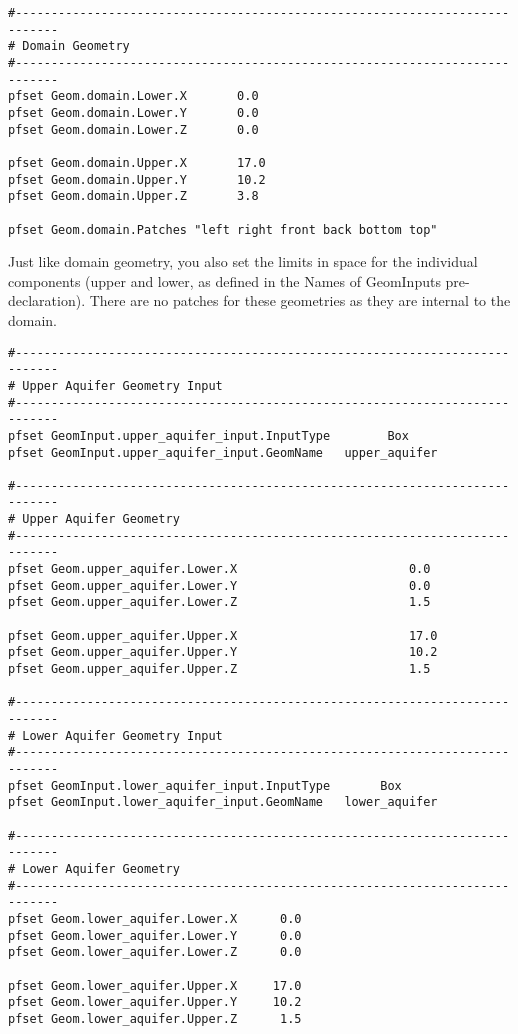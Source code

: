 \begin{verbatim}
#----------------------------------------------------------------------------
# Domain Geometry
#----------------------------------------------------------------------------
pfset Geom.domain.Lower.X       0.0 
pfset Geom.domain.Lower.Y       0.0
pfset Geom.domain.Lower.Z       0.0

pfset Geom.domain.Upper.X       17.0
pfset Geom.domain.Upper.Y       10.2
pfset Geom.domain.Upper.Z       3.8

pfset Geom.domain.Patches "left right front back bottom top"
\end{verbatim}

Just like domain geometry, you also set the limits in space for the individual components 
(upper and lower, as defined in the Names of GeomInputs pre-declaration).  There are no patches 
for these geometries as they are internal to the domain.

\begin{verbatim}
#----------------------------------------------------------------------------
# Upper Aquifer Geometry Input
#----------------------------------------------------------------------------
pfset GeomInput.upper_aquifer_input.InputType        Box
pfset GeomInput.upper_aquifer_input.GeomName   upper_aquifer

#----------------------------------------------------------------------------
# Upper Aquifer Geometry
#----------------------------------------------------------------------------
pfset Geom.upper_aquifer.Lower.X                        0.0 
pfset Geom.upper_aquifer.Lower.Y                        0.0
pfset Geom.upper_aquifer.Lower.Z                        1.5

pfset Geom.upper_aquifer.Upper.X                        17.0
pfset Geom.upper_aquifer.Upper.Y                        10.2
pfset Geom.upper_aquifer.Upper.Z                        1.5

#----------------------------------------------------------------------------
# Lower Aquifer Geometry Input
#----------------------------------------------------------------------------
pfset GeomInput.lower_aquifer_input.InputType       Box
pfset GeomInput.lower_aquifer_input.GeomName   lower_aquifer

#----------------------------------------------------------------------------
# Lower Aquifer Geometry
#----------------------------------------------------------------------------
pfset Geom.lower_aquifer.Lower.X      0.0 
pfset Geom.lower_aquifer.Lower.Y      0.0
pfset Geom.lower_aquifer.Lower.Z      0.0

pfset Geom.lower_aquifer.Upper.X     17.0
pfset Geom.lower_aquifer.Upper.Y     10.2
pfset Geom.lower_aquifer.Upper.Z      1.5
\end{verbatim}

